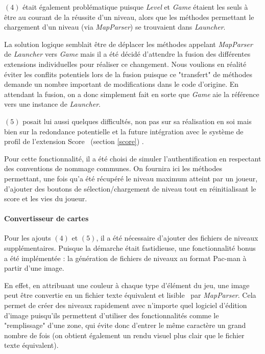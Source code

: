 \documentclass[12pt, openany]{report}
\begin{document}
$(4)$ était également problématique puisque \mbox{\textit{Level}} et \mbox{\textit{Game}} étaient les seuls à être au courant de la réussite d'un niveau, alors que les méthodes permettant le chargement d'un niveau (via \mbox{\textit{MapParser}}) se trouvaient dans \mbox{\textit{Launcher}}. 

La solution logique semblait être de déplacer les méthodes appelant \mbox{\textit{MapParser}} de \mbox{\textit{Launcher}} vers \mbox{\textit{Game}} mais il a été décidé d'attendre la fusion des différentes extensions individuelles pour réaliser ce changement. Nous voulions en réalité éviter les conflits potentiels lors de la fusion puisque ce "transfert" de méthodes demande un nombre important de modifications dans le code d'origine. En attendant la fusion, on a donc simplement fait en sorte que \mbox{\textit{Game}} aie la référence vers une instance de \mbox{\textit{Launcher}}.

$(5)$ posait lui aussi quelques difficultés, non pas sur sa réalisation en soi mais bien sur la redondance potentielle et la future intégration avec le système de profil de l'extension \og Score \fg \, (section \ref{score}) . 

Pour cette fonctionnalité, il a été choisi de simuler l'authentification en respectant des conventions de nommage communes. On fournira ici les méthodes permettant, une fois qu'a été récupéré le niveau maximum atteint par un joueur, d'ajouter des boutons de sélection/chargement de niveau tout en réinitialisant le score et les vies du joueur.

\paragraph{Convertisseur de cartes} \label{map_generator_txt}
Pour les ajouts $(4)$ et $(5)$, il a été nécessaire d'ajouter des fichiers de niveaux supplémentaires. Puisque la démarche était fastidieuse, une fonctionnalité \og bonus \fg \, a été implémentée : la génération de fichiers de niveaux au format Pac-man à partir d'une image.

En effet, en attribuant une couleur à chaque type d'élément du jeu,  une image peut être convertie en un fichier texte équivalent et \og lisible \fg \, par \mbox{\textit{MapParser}}. Cela permet de créer des niveaux rapidement avec n'importe quel logiciel d'édition d'image puisqu'ils permettent d'utiliser des fonctionnalités comme le "remplissage" d'une zone, qui évite donc d'entrer le même caractère un grand nombre de fois (on obtient également un rendu visuel plus clair que le fichier texte équivalent). 
\end{document}
